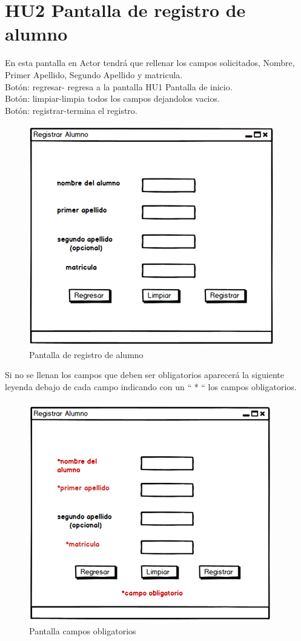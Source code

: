 

\section{HU2 Pantalla de registro de alumno}

En esta pantalla en Actor tendrá que rellenar los campos solicitados, Nombre, Primer Apellido, Segundo Apellido y matricula.\\
Botón: regresar- regresa a la pantalla HU1 Pantalla de inicio.\\
Botón: limpiar-limpia todos los campos dejandolos vacios.\\
Botón: registrar-termina el registro.
\begin{figure}[h]
	\centering
	\includegraphics[scale=0.5]{./HistoriasUsuario/imagenes/IHU2.png}
	\caption{Pantalla de registro de alumno}
\end{figure}
Si no se llenan los campos que deben ser obligatorios aparecerá la siguiente leyenda debajo de cada campo indicando con un  “ * “ los campos obligatorios.
\begin{figure}[h]
	\centering
	\includegraphics[scale=0.5]{./HistoriasUsuario/imagenes/IHU3.png}
	\caption{Pantalla campos obligatorios}
\end{figure}
